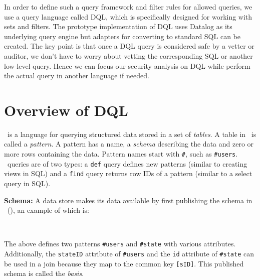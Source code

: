 In order to define such a query framework and filter rules for allowed queries, we use a query language called DQL, which is specifically designed for working with sets and filters. The prototype implementation of DQL uses Datalog as its underlying query engine but adapters for converting to standard SQL can be created. The key point is that once a DQL query is considered safe by a vetter or auditor, we don't have to worry about vetting the corresponding SQL or another low-level query. Hence we can focus our security analysis on DQL while perform the actual query in another language if needed. 

\section{Overview of DQL}

\dsl~is a language for querying structured data stored in a set of {\em tables}. A table in \dsl~is called a {\em pattern}. 
A pattern has a name, a {\em schema} describing the data and zero or more rows containing the data. %
Pattern names start with \texttt{\#}, such as \texttt{\#users}. 
\dsl~queries are of two types: a \texttt{def} query defines new patterns (similar to creating views in SQL) and a \texttt{find} query returns row IDs of a pattern (similar to a select query in SQL). 

\textbf{Schema:} A data store makes its data available by first publishing the schema in \dcl~(\dclfull), an example of which is: 


{\small
	\\
}

The above defines two patterns \texttt{\#users} and \texttt{\#state} with various attributes. Additionally, the \texttt{stateID} attribute of \texttt{\#users} and the \texttt{id} attribute
of \texttt{\#state} can be used in a join because they map to the common key \texttt{[sID]}. This published schema is called the {\em basis}. 


